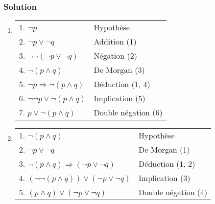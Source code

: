     \subsubsection*{Solution}
    \begin{enumerate}

	\item  \hspace{1em}
    \begin{center}
    \begin{tabular}{|l|l|}
    \hline
    \hspace{0.5cm} 1. $\neg p$ & Hypothèse \\
    \hspace{0.5cm} 2. $\neg p \lor \neg q$ & Addition (1) \\
    \hspace{0.5cm} 3. $\neg \neg(\neg p \lor \neg q)$ & Négation (2) \\
    \hspace{0.5cm} 4. $\neg(p \land q)$ & De Morgan (3)\\
    5. $\neg p \Rightarrow \neg(p \land q)$ & Déduction (1, 4) \\
    6. $\neg \neg p \lor \neg(p \land q)$ & Implication (5)\\
    7. $p \lor \neg(p \land q)$ & Double négation (6)\\
    \hline
    \end{tabular}
    \end{center}

	\item  \hspace{1em}
    \begin{center}
    \begin{tabular}{|l|l|}
    \hline
    \hspace{0.5cm} 1. $\neg (p \land q)$ & Hypothèse \\
    \hspace{0.5cm} 2. $\neg p \lor \neg q$ & De Morgan (1) \\
    3. $\neg (p \land q) \Rightarrow (\neg p \lor \neg q)$ & Déduction (1, 2) \\
    4. $(\neg \neg(p \land q)) \lor (\neg p \lor \neg q)$ & Implication (3) \\
    5. $(p \land q) \lor (\neg p \lor \neg q)$ & Double négation (4) \\
    \hline
    \end{tabular}
    \end{center}


\end{enumerate}
